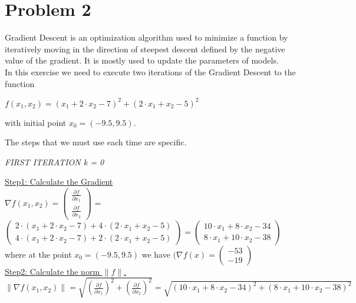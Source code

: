
\section{Problem 2}
Gradient Descent is an optimization algorithm used to minimize a function by iteratively moving in the direction of steepest descent defined by the negative value of the gradient. It is mostly used to update the parameters of models.\\
In this exercise we need to execute two iterations of the Gradient Descent to the function
\begin{center}
$	f(x_1,x_2) = (x_1+2 \cdot x_2 - 7)^2 + (2 \cdot x_1 + x_2 -5)^2$
\end{center}
with initial point $x_0 = (-9.5,9.5)$.

The steps that we must use each time are specific.
\begin{center}
	\textit{FIRST ITERATION k = 0}
\end{center}

\underline{Step1: Calculate the Gradient}\\

\(\nabla f(x_1,x_2) = \left(\begin{array}{c}
	\frac{\partial f}{\partial x_1} \\[1mm]
	\frac{\partial f}{\partial x_2}
\end{array}\right)\) = $\left(\begin{array}{c}
 2 \cdot (x_1 + 2 \cdot x_2 - 7) + 4 \cdot (2 \cdot x_1 + x_2 -5)\\[1mm]
4 \cdot (x_1 + 2 \cdot x_2 -7) + 2 \cdot (2 \cdot x_1 + x_2 - 5)
\end{array}\right) = \left(\begin{array}{c}
10 \cdot x_1 + 8 \cdot x_2 - 34\\[1mm]
8 \cdot x_1 + 10 \cdot x_2 -38
\end{array}\right)$ \\[3mm]

where at the point $x_0 = (-9.5,9.5)$ we have $(\nabla f(x) = \left(\begin{array}{c}
	-53 \\
	-19
\end{array}\right)$
\\[4mm]

\underline{Step2: Calculate the norm \(\|f\|\).}\\

\(\|\nabla f(x_1,x_2)\| = \sqrt{\left(\frac{\partial f}{\partial x_1}\right)^2 + \left(\frac{\partial f}{\partial x_2}\right)^2} = \sqrt{\left(10 \cdot x_1 + 8 \cdot x_2 - 34\right)^2 + \left(8 \cdot x_1 + 10 \cdot x_2 -38\right)^2}\) \\[2mm]


